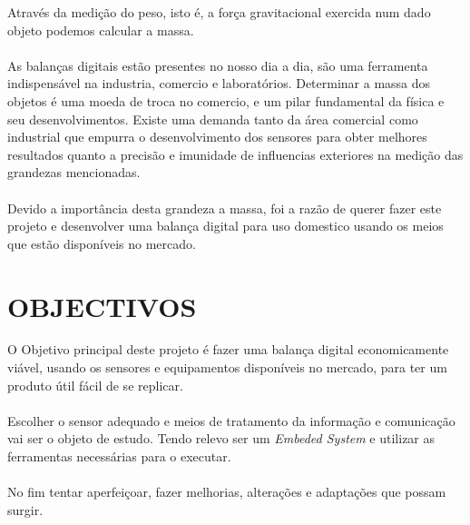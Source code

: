Através da medição do peso, isto é, a força gravitacional exercida num dado objeto podemos calcular a massa. \cite{book-2}\\
\\
As balanças digitais estão presentes no nosso dia a dia, são uma ferramenta indispensável na industria, comercio e laboratórios. Determinar a massa dos objetos é uma moeda de troca no comercio, e um pilar fundamental da física e seu desenvolvimentos. Existe uma demanda tanto da área comercial como industrial que empurra o desenvolvimento dos sensores para obter melhores resultados quanto a precisão e imunidade de influencias exteriores na medição das grandezas mencionadas.\\
\\
Devido a importância desta grandeza a massa, foi a razão de querer fazer este projeto e desenvolver uma balança digital para uso domestico usando os meios que estão disponíveis no mercado.
\newpage
\section{OBJECTIVOS}

O Objetivo principal deste projeto é fazer uma balança digital economicamente viável, usando os sensores e equipamentos disponíveis no mercado, para ter um produto útil fácil de se replicar.
\\
\\
Escolher o sensor adequado e meios de tratamento da informação e comunicação vai ser o objeto de estudo. Tendo relevo ser um \textit{Embeded System} e utilizar as ferramentas necessárias para o executar.
\\
\\
No fim tentar aperfeiçoar, fazer melhorias, alterações e adaptações que possam surgir.
\newpage
